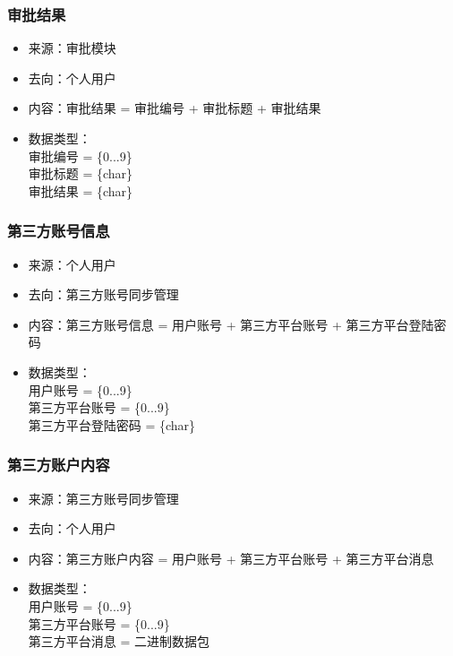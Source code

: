 {            \subsubsection{\color{red} 审批结果}
            \begin{itemize}
                \item 来源：审批模块
                \item 去向：个人用户
                \item 内容：审批结果 = 审批编号 + 审批标题 + 审批结果
                \item 数据类型：\\
                    审批编号 = \{0...9\}\\
                    审批标题 = \{char\}\\
                    审批结果 = \{char\}\\
            \end{itemize}
            \subsubsection{\color{red} 第三方账号信息}
            \begin{itemize}
                \item 来源：个人用户
                \item 去向：第三方账号同步管理
                \item 内容：第三方账号信息 = 用户账号 + 第三方平台账号 + 第三方平台登陆密码
                \item 数据类型：\\
                    用户账号 = \{0...9\}\\
                    第三方平台账号 = \{0...9\}\\
                    第三方平台登陆密码 = \{char\}\\
            \end{itemize}
            \subsubsection{\color{red} 第三方账户内容}
            \begin{itemize}
                \item 来源：第三方账号同步管理
                \item 去向：个人用户
                \item 内容：第三方账户内容 = 用户账号 + 第三方平台账号 + 第三方平台消息
                \item 数据类型：\\
                    用户账号 = \{0...9\}\\
                    第三方平台账号 = \{0...9\}\\
                    第三方平台消息 = 二进制数据包\\
            \end{itemize}
}
